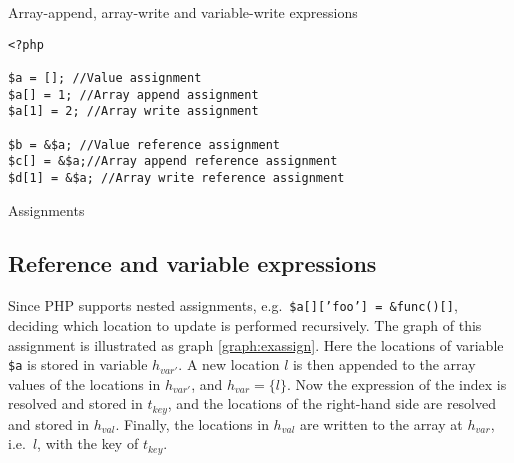 \begin{graph}
{\begin{adjustbox}{max size={.24\textwidth}{.25\textheight}}
\begin{tikzpicture}[node distance = 2cm, auto]
\end{tikzpicture}\end{adjustbox}}\hfill%
\hspace*{\fill}
\caption{Array-append, array-write and variable-write expressions}
\end{graph}
\begin{program}
\begin{lstlisting}
<?php

$a = []; //Value assignment
$a[] = 1; //Array append assignment
$a[1] = 2; //Array write assignment

$b = &$a; //Value reference assignment
$c[] = &$a;//Array append reference assignment
$d[1] = &$a; //Array write reference assignment

\end{lstlisting}
\caption{Assignments}
\label{lst:assignments}
\end{program}

\subsection{Reference and variable expressions}
Since PHP supports nested assignments, e.g.\ \texttt{\$a[]['foo']  = \&func()[]}, deciding which location to update is performed recursively. The graph of this assignment is illustrated as graph \ref{graph:exassign}. Here the locations of variable \texttt{\$a} is stored in variable $h_{var'}$. A new location $l$ is then appended to the array values of the locations in $h_{var'}$, and $h_{var} = \{l\}$. Now the expression of the index is resolved and stored in $t_{key}$, and the locations of the right-hand side are resolved and stored in $h_{val}$. Finally, the locations in $h_{val}$ are written to the array at $h_{var}$, i.e.\ $l$, with the key of $t_{key}$. 

